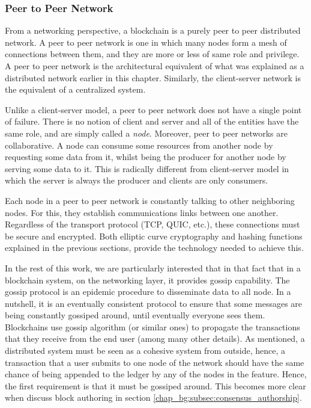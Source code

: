 \subsubsection{Peer to Peer Network} \label{chap_bg:subsec:p2p}

From a networking perspective, a blockchain is a purely peer to peer distributed network. A peer to
peer network is one in which many nodes form a mesh of connections between them, and they are more
or less of same role and privilege. A peer to peer network is the architectural equivalent of what
was explained as a distributed network earlier in this chapter. Similarly, the client-server network
is the equivalent of a centralized system.

Unlike a client-server model, a peer to peer network does not have a single point of failure. There
is no notion of client and server and all of the entities have the same role, and are simply called
a \textit{node}. Moreover, peer to peer networks are collaborative. A node can consume some
resources from another node by requesting some data from it, whilst being the producer for another
node by serving some data to it. This is radically different from client-server model in which the
server is always the producer and clients are only consumers.

Each node in a peer to peer network is constantly talking to other neighboring nodes. For this, they
establish communications links between one another. Regardless of the transport protocol (TCP, QUIC,
etc.), these connections must be secure and encrypted. Both elliptic curve cryptography and hashing
functions explained in the previous sections, provide the technology needed to achieve this.

In the rest of this work, we are particularly interested that in that fact that in a blockchain
system, on the networking layer, it provides gossip capability. The gossip protocol is an epidemic
procedure to disseminate data to all node. In a nutshell, it is an eventually consistent protocol to
ensure that some messages are being constantly gossiped around, until eventually everyone sees them.
Blockchains use gossip algorithm (or similar ones) to propagate the transactions that they receive
from the end user (among many other details). As mentioned, a distributed system must be seen as a
cohesive system from outside, hence, a transaction that a user submits to one node of the network
should have the same chance of being appended to the ledger by any of the nodes in the feature.
Hence, the first requirement is that it must be gossiped around. This becomes more clear when
discuss block authoring in section \ref{chap_bg:subsec:consensus_authorship}.

